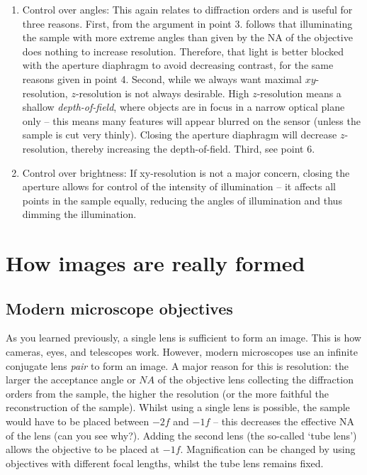 \documentclass[a4paper]{report}
\begin{document}
\begin{enumerate}
    \item Control over angles: This again relates to diffraction orders and is useful for three reasons. First, from the argument in point 3. follows that illuminating the sample with more extreme angles than given by the NA of the objective does nothing to increase resolution. Therefore, that light is better blocked with the aperture diaphragm to avoid decreasing contrast, for the same reasons given in point 4. Second, while we always want maximal $xy$-resolution, $z$-resolution is not always desirable. High $z$-resolution means a shallow \emph{depth-of-field}, where objects are in focus in a narrow optical plane only -- this means many features will appear blurred on the sensor (unless the sample is cut very thinly). Closing the aperture diaphragm will decrease $z$-resolution, thereby increasing the depth-of-field. Third, see point 6.
    \item Control over brightness: If xy-resolution is not a major concern, closing the aperture allows for control of the intensity of illumination -- it affects all points in the sample equally, reducing the angles of illumination and thus dimming the illumination.
\end{enumerate}

\pagebreak


\section{How images are really formed}
\subsection{Modern microscope objectives}
As you learned previously, a single lens is sufficient to form an image. 
This is how cameras, eyes, and telescopes work. 
However, modern microscopes use an infinite conjugate lens \textit{pair} to form an image. 
A major reason for this is resolution: the larger the acceptance angle or $NA$ of the objective lens collecting the diffraction orders from the sample, the higher the resolution (or the more faithful the reconstruction of the sample). 
Whilst using a single lens is possible, the sample would have to be placed between $-2f$ and $-1f$ -- this decreases the effective NA of the lens (can you see why?).
Adding the second lens (the so-called `tube lens') allows the objective to be placed at $-1f$. 
Magnification can be changed by using objectives with different focal lengths, whilst the tube lens remains fixed. 
\end{document}
